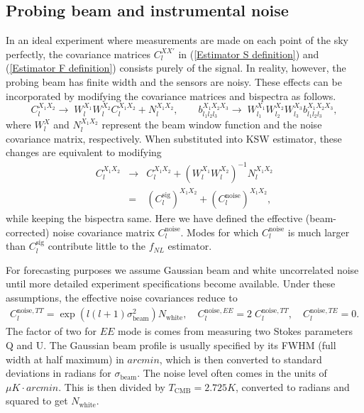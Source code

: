 \subsection{Probing beam and instrumental noise}

In an ideal experiment where measurements are made on each point of the sky perfectly, the covariance matrices $C_l^{XX'}$ in (\ref{Estimator S definition}) and (\ref{Estimator F definition}) consists purely of the signal. In reality, however, the probing beam has finite width and the sensors are noisy. These effects can be incorporated by modifying the covariance matrices and bispectra as follows.
\begin{equation}
	C_l^{X_1 X_2} \rightarrow\; W_l^{X_1} W_l^{X_2} C_l^{X_1 X_2} + N_l^{X_1 X_2} ,\qquad b_{l_1 l_2 l_3}^{X_1 X_2 X_3} \rightarrow\; W_{l_1}^{X_1} W_{l_2}^{X_2} W_{l_3}^{X_3} b_{l_1 l_2 l_3}^{X_1 X_2 X_3},
\end{equation}
where $W_l^X$ and $N_l^{X_1 X_2}$ represent the beam window function and the noise covariance matrix, respectively. When substituted into KSW estimator, these changes are equivalent to modifying
\begin{eqnarray}
	C_l^{X_1 X_2} &\rightarrow& C_l^{X_1 X_2} + \left( W_l^{X_1} W_l^{X_2} \right)^{-1} N_l^{X_1 X_2} \nonumber \\ &=& ( C_l^\text{sig} )^{X_1 X_2} + ( C_l^\text{noise} )^{X_1 X_2},
\end{eqnarray}
while keeping the bispectra same. Here we have defined the effective (beam-corrected) noise covariance matrix $C_l^\text{noise}$. Modes for which $C_l^\text{noise}$ is much larger than $C_l^\text{sig}$ contribute little to the $f_{NL}$ estimator.

For forecasting purposes we assume Gaussian beam and white uncorrelated noise until more detailed experiment specifications become available. Under these assumptions, the effective noise covariances reduce to \cite{Ng1999}
\begin{eqnarray}
	C_l^{\text{noise}, TT} = \exp\left({l(l+1)\sigma_\text{beam}^2} \right)N_\text{white}, \quad C_l^{\text{noise}, EE} =2\; C_l^{\text{noise}, TT}, \quad C_l^{\text{noise}, TE} = 0.
\end{eqnarray}
The factor of two for $EE$ mode is comes from measuring two Stokes parameters Q and U. The Gaussian beam profile is usually specified by its FWHM (full width at half maximum) in $arcmin$, which is then converted to standard deviations in radians for $\sigma_\text{beam}$. The noise level often comes in the units of $\mu K\cdot arcmin$. This is then divided by $T_\text{CMB} = 2.725K$, converted to radians and squared to get $N_\text{white}$.

